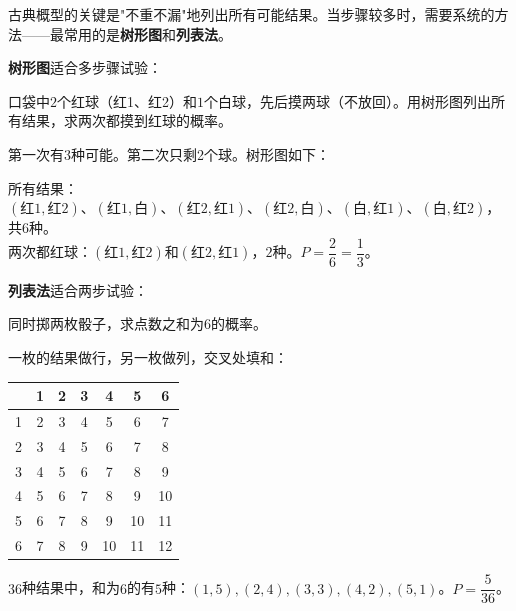 
古典概型的关键是"不重不漏"地列出所有可能结果。当步骤较多时，需要系统的方法——最常用的是\textbf{树形图}和\textbf{列表法}。

\textbf{树形图}适合多步骤试验：

\begin{example}
口袋中$2$个红球（红1、红2）和$1$个白球，先后摸两球（不放回）。用树形图列出所有结果，求两次都摸到红球的概率。
\end{example}
\begin{solution}
第一次有3种可能。第二次只剩2个球。树形图如下：
\begin{center}
\end{center}
所有结果：$(红1,红2)、(红1,白)、(红2,红1)、(红2,白)、(白,红1)、(白,红2)$，共$6$种。\\
两次都红球：$(红1,红2)$和$(红2,红1)$，$2$种。$P=\dfrac{2}{6}=\dfrac13$。
\end{solution}

\textbf{列表法}适合两步试验：

\begin{example}
同时掷两枚骰子，求点数之和为$6$的概率。
\end{example}
\begin{solution}
一枚的结果做行，另一枚做列，交叉处填和：
\begin{center}
\begin{tabular}{c|cccccc}
 & 1 & 2 & 3 & 4 & 5 & 6\\\hline
1 & 2 & 3 & 4 & 5 & 6 & 7\\
2 & 3 & 4 & 5 & 6 & 7 & 8\\
3 & 4 & 5 & 6 & 7 & 8 & 9\\
4 & 5 & 6 & 7 & 8 & 9 & 10\\
5 & 6 & 7 & 8 & 9 & 10 & 11\\
6 & 7 & 8 & 9 & 10 & 11 & 12
\end{tabular}
\end{center}
$36$种结果中，和为$6$的有$5$种：$(1,5),(2,4),(3,3),(4,2),(5,1)$。$P=\dfrac{5}{36}$。
\end{solution}

